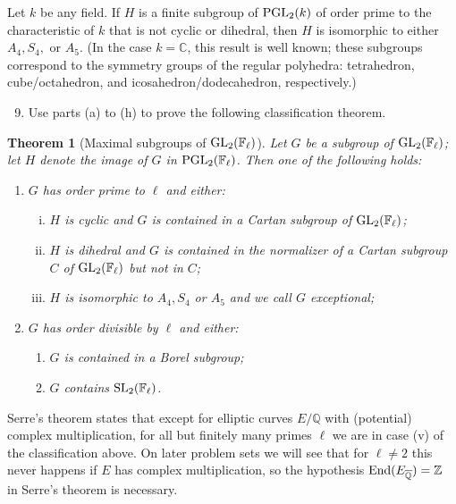 \documentclass[11pt]{article}
\newcommand{\F}{\mathbb{F}}
\newcommand{\Q}{\mathbb{Q}}
\newcommand{\C}{\mathbb{C}}
\newcommand{\Z}{\mathbb{Z}}
\newcommand{\GL}{{\rm GL}}
\newcommand{\PGL}{{\rm PGL}}
\newcommand{\End}{{\rm End}}
\newcommand{\SL}{{\rm SL}}
\newtheorem*{theorem}{Theorem}
\theoremstyle{definition}
\begin{document}
Let $k$ be any field.  If $H$ is a finite subgroup of $\PGL_2(k)$ of order prime to the characteristic of $k$ that is not cyclic or dihedral, then $H$ is isomorphic to either $A_4, S_4, $ or $A_5$.  (In the case $k = \C$, this result is well known; these subgroups correspond to the symmetry groups of the regular polyhedra: tetrahedron, cube/octahedron, and icosahedron/dodecahedron, respectively.)

\begin{enumerate}[{\bf(a)}]
\setcounter{enumi}{8}
\item Use parts (a) to (h) to prove the following classification theorem.
\end{enumerate}

\begin{theorem}[Maximal subgroups of $\GL_2(\F_\ell)$]
Let $G$ be a subgroup of $\GL_2(\F_\ell)$; let $H$ denote the image of $G$ in $\PGL_2(\F_\ell)$.  Then one of the following holds:
\begin{enumerate}
\setlength{\itemsep}{0pt}
\item $G$ has order prime to $\ell$ and either:
\begin{enumerate}[(i)]
\setlength{\itemsep}{0pt}
\item $H$ is cyclic and $G$ is contained in a Cartan subgroup of $\GL_2(\F_\ell)$;
\item $H$ is dihedral and $G$ is contained in the normalizer of a Cartan subgroup $C$ of $\GL_2(\F_\ell)$ but not in $C$;
\item $H$ is isomorphic to $A_4, S_4$ or $A_5$ and we call $G$ exceptional;
\end{enumerate}
\item $G$ has order divisible by $\ell$ and either:
\begin{enumerate}
\setlength{\itemsep}{0pt}
\item[(iv)] $G$ is contained in a Borel subgroup;
\item[(v)] $G$ contains $\SL_2(\F_\ell)$.
\end{enumerate}
\end{enumerate}
\end{theorem}
\smallskip

\noindent
Serre's theorem states that except for elliptic curves $E/\Q$ with (potential) complex multiplication, for all but finitely many primes $\ell$ we are in case (v) of the classification above.
On later problem sets we will see that for $\ell\ne 2$ this never happens if $E$ has complex multiplication, so the hypothesis $\End(E_{\overline{\Q}})=\Z$ in Serre's theorem is necessary.
\end{document}
